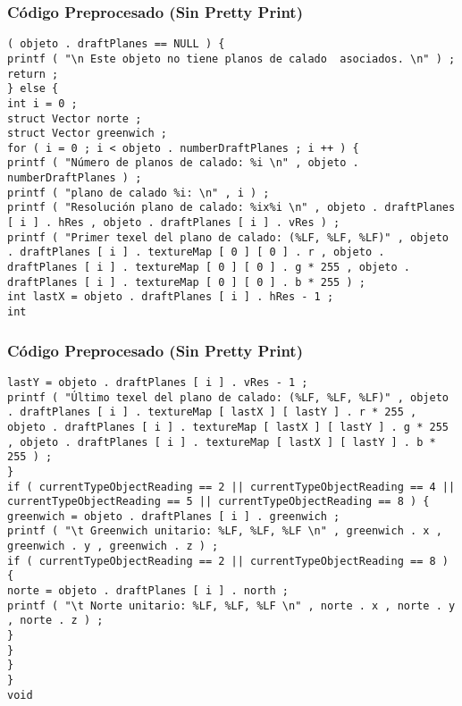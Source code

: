 \documentclass{beamer}
\begin{document}
\begin{frame}[fragile]
\frametitle{C\'odigo Preprocesado (Sin Pretty Print)}
\begin{lstlisting}[style=CStyle]
( objeto . draftPlanes == NULL ) { 
printf ( "\n Este objeto no tiene planos de calado  asociados. \n" ) ; 
return ; 
} else { 
int i = 0 ; 
struct Vector norte ; 
struct Vector greenwich ; 
for ( i = 0 ; i < objeto . numberDraftPlanes ; i ++ ) { 
printf ( "Número de planos de calado: %i \n" , objeto . numberDraftPlanes ) ; 
printf ( "plano de calado %i: \n" , i ) ; 
printf ( "Resolución plano de calado: %ix%i \n" , objeto . draftPlanes [ i ] . hRes , objeto . draftPlanes [ i ] . vRes ) ; 
printf ( "Primer texel del plano de calado: (%LF, %LF, %LF)" , objeto . draftPlanes [ i ] . textureMap [ 0 ] [ 0 ] . r , objeto . draftPlanes [ i ] . textureMap [ 0 ] [ 0 ] . g * 255 , objeto . draftPlanes [ i ] . textureMap [ 0 ] [ 0 ] . b * 255 ) ; 
int lastX = objeto . draftPlanes [ i ] . hRes - 1 ; 
int \end{lstlisting}
\end{frame}
\begin{frame}[fragile]
\frametitle{C\'odigo Preprocesado (Sin Pretty Print)}
\begin{lstlisting}[style=CStyle]
lastY = objeto . draftPlanes [ i ] . vRes - 1 ; 
printf ( "Último texel del plano de calado: (%LF, %LF, %LF)" , objeto . draftPlanes [ i ] . textureMap [ lastX ] [ lastY ] . r * 255 , objeto . draftPlanes [ i ] . textureMap [ lastX ] [ lastY ] . g * 255 , objeto . draftPlanes [ i ] . textureMap [ lastX ] [ lastY ] . b * 255 ) ; 
} 
if ( currentTypeObjectReading == 2 || currentTypeObjectReading == 4 || currentTypeObjectReading == 5 || currentTypeObjectReading == 8 ) { 
greenwich = objeto . draftPlanes [ i ] . greenwich ; 
printf ( "\t Greenwich unitario: %LF, %LF, %LF \n" , greenwich . x , greenwich . y , greenwich . z ) ; 
if ( currentTypeObjectReading == 2 || currentTypeObjectReading == 8 ) { 
norte = objeto . draftPlanes [ i ] . north ; 
printf ( "\t Norte unitario: %LF, %LF, %LF \n" , norte . x , norte . y , norte . z ) ; 
} 
} 
} 
} 
void \end{lstlisting}
\end{frame}
\end{document}
